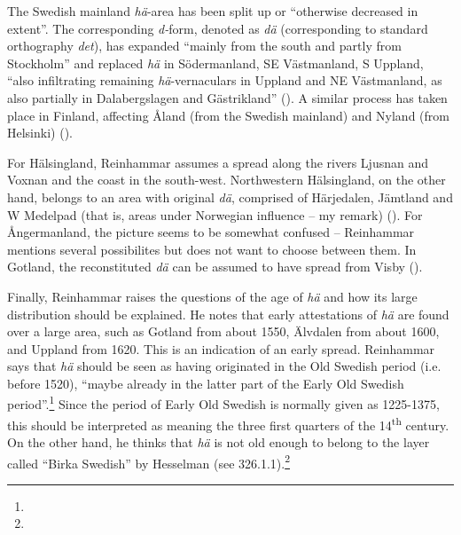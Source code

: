 \begin{styleBodytextC}
The Swedish mainland \textit{hä}{}-area has been split up or “otherwise decreased in extent”. The corresponding \textit{d-}form, denoted as \textit{dä} (corresponding to standard orthography \textit{det}), has expanded “mainly from the south and partly from Stockholm” and replaced \textit{hä} in Södermanland, SE Västmanland, S Uppland, “also infiltrating remaining \textit{hä}{}-vernaculars in Uppland and NE Västmanland, as also partially in Dalabergslagen and Gästrikland” (\citet[186]{Reinhammar1975}). A similar process has taken place in Finland, affecting Åland (from the Swedish mainland) and Nyland (from Helsinki) (\citet[187]{Reinhammar1975}).

\end{styleBodytextC}

\begin{styleBodytextC}
For Hälsingland, Reinhammar assumes a spread along the rivers Ljusnan and Voxnan and the coast in the south-west. Northwestern Hälsingland, on the other hand, belongs to an area with original \textit{dä}, comprised of Härjedalen, Jämtland and W Medelpad (that is, areas under Norwegian influence – my remark) (\citet[186]{Reinhammar1975}). For Ångermanland, the picture seems to be somewhat confused – Reinhammar mentions several possibilites but does not want to choose between them. In Gotland, the reconstituted \textit{dä} can be assumed to have spread from Visby (\citet[188]{Reinhammar1975}). 

\end{styleBodytextC}

\begin{styleBodytextC}
Finally, Reinhammar raises the questions of the age of \textit{hä} and how its large distribution should be explained. He notes that early attestations of \textit{hä} are found over a large area, such as Gotland from about 1550, Älvdalen from about 1600, and Uppland from 1620. This is an indication of an early spread. Reinhammar says that \textit{hä} should be seen as having originated in the Old Swedish period (i.e. before 1520), “maybe already in the latter part of the Early Old Swedish period”.\footnote{} Since the period of Early Old Swedish is normally given as 1225-1375, this should be interpreted as meaning the three first quarters of the 14\textsuperscript{th} century. On the other hand, he thinks that \textit{hä }is not old enough to belong to the layer called “Birka Swedish” by Hesselman (see 326.1.1).\footnote{} 

\end{styleBodytextC}

